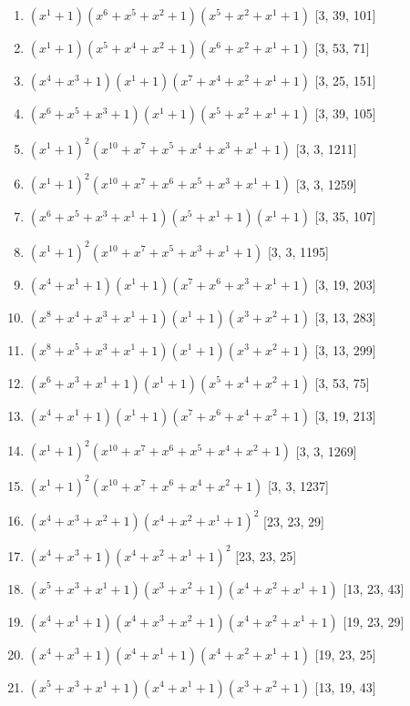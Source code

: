 \documentclass[10pt,twocolumn]{article}
\begin{document}
\begin{enumerate}
\item $(x^{1} + 1)(x^{6} + x^{5} + x^{2} + 1)(x^{5} + x^{2} + x^{1} + 1)$  [3, 39, 101]
\item $(x^{1} + 1)(x^{5} + x^{4} + x^{2} + 1)(x^{6} + x^{2} + x^{1} + 1)$  [3, 53, 71]
\item $(x^{4} + x^{3} + 1)(x^{1} + 1)(x^{7} + x^{4} + x^{2} + x^{1} + 1)$  [3, 25, 151]
\item $(x^{6} + x^{5} + x^{3} + 1)(x^{1} + 1)(x^{5} + x^{2} + x^{1} + 1)$  [3, 39, 105]
\item $(x^{1} + 1)^{2}(x^{10} + x^{7} + x^{5} + x^{4} + x^{3} + x^{1} + 1)$  [3, 3, 1211]
\item $(x^{1} + 1)^{2}(x^{10} + x^{7} + x^{6} + x^{5} + x^{3} + x^{1} + 1)$  [3, 3, 1259]
\item $(x^{6} + x^{5} + x^{3} + x^{1} + 1)(x^{5} + x^{1} + 1)(x^{1} + 1)$  [3, 35, 107]
\item $(x^{1} + 1)^{2}(x^{10} + x^{7} + x^{5} + x^{3} + x^{1} + 1)$  [3, 3, 1195]
\item $(x^{4} + x^{1} + 1)(x^{1} + 1)(x^{7} + x^{6} + x^{3} + x^{1} + 1)$  [3, 19, 203]
\item $(x^{8} + x^{4} + x^{3} + x^{1} + 1)(x^{1} + 1)(x^{3} + x^{2} + 1)$  [3, 13, 283]
\item $(x^{8} + x^{5} + x^{3} + x^{1} + 1)(x^{1} + 1)(x^{3} + x^{2} + 1)$  [3, 13, 299]
\item $(x^{6} + x^{3} + x^{1} + 1)(x^{1} + 1)(x^{5} + x^{4} + x^{2} + 1)$  [3, 53, 75]
\item $(x^{4} + x^{1} + 1)(x^{1} + 1)(x^{7} + x^{6} + x^{4} + x^{2} + 1)$  [3, 19, 213]
\item $(x^{1} + 1)^{2}(x^{10} + x^{7} + x^{6} + x^{5} + x^{4} + x^{2} + 1)$  [3, 3, 1269]
\item $(x^{1} + 1)^{2}(x^{10} + x^{7} + x^{6} + x^{4} + x^{2} + 1)$  [3, 3, 1237]
\item $(x^{4} + x^{3} + x^{2} + 1)(x^{4} + x^{2} + x^{1} + 1)^{2}$  [23, 23, 29]
\item $(x^{4} + x^{3} + 1)(x^{4} + x^{2} + x^{1} + 1)^{2}$  [23, 23, 25]
\item $(x^{5} + x^{3} + x^{1} + 1)(x^{3} + x^{2} + 1)(x^{4} + x^{2} + x^{1} + 1)$  [13, 23, 43]
\item $(x^{4} + x^{1} + 1)(x^{4} + x^{3} + x^{2} + 1)(x^{4} + x^{2} + x^{1} + 1)$  [19, 23, 29]
\item $(x^{4} + x^{3} + 1)(x^{4} + x^{1} + 1)(x^{4} + x^{2} + x^{1} + 1)$  [19, 23, 25]
\item $(x^{5} + x^{3} + x^{1} + 1)(x^{4} + x^{1} + 1)(x^{3} + x^{2} + 1)$  [13, 19, 43]

\end{enumerate}
\end{document}
